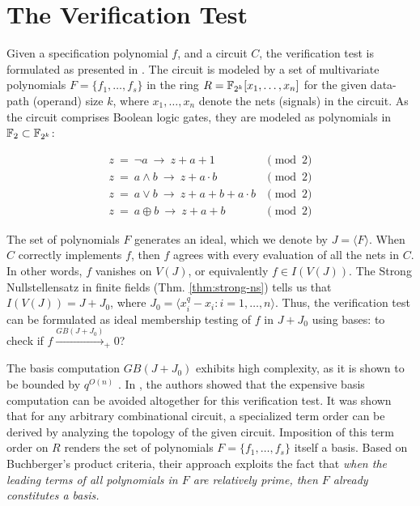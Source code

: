 \section{The Verification Test}
\label{sec:verify}

Given a specification polynomial $f$, and a circuit $C$, the
verification test is formulated as presented in
\cite{lv:tcad2013}. The circuit is modeled by a set of multivariate
polynomials $F=\{f_1,\dots,f_s\}$ in the ring $R={\mathbb{F}}_{2^k}[x_1,\dots,x_n]$
for the given data-path (operand) size $k$, where $x_1,\dots,x_n$
denote the nets (signals) in the circuit. As the circuit comprises
Boolean logic gates, they are modeled as polynomials in ${\mathbb{F}}_2 \subset
{\mathbb{F}}_{2^k}$:

\begin{equation}
\label{bool2poly}
\begin{split}
z ~ =  ~ \neg a ~ \rightarrow ~ z+a+1 & \pmod 2  \\
z ~ =  ~ a \wedge b ~ \rightarrow ~ z+a \cdot b & \pmod 2\\
z ~ =  ~ a \vee b ~ \rightarrow ~ z+a+b+a \cdot b & \pmod 2 \\
z ~ =  ~ a \oplus b ~ \rightarrow ~ z+a+b & \pmod 2 
\end{split}
\end{equation}

The set of polynomials $F$ generates an ideal, which we denote by $J =
\langle F\rangle$. When $C$ correctly implements $f$, then $f$ agrees
with every evaluation of all the nets in $C$. In other words, $f$
vanishes on $V(J)$, or equivalently $f \in I(V(J))$. The Strong
Nullstellensatz in finite fields (Thm. \ref{thm:strong-ns}) tells us
that $I(V(J)) = J + J_0$, where $J_0 = \langle x_i^q-x_i:
i=1,\dots,n\rangle$. Thus, the verification test can be formulated as
ideal membership testing of $f$ in $J+J_0$ using \Grobner bases: to
check if $f\xrightarrow{GB(J+J_0)}_+0$?

The \Grobner basis computation $GB(J+J_0)$ exhibits high
complexity, as it is shown to be bounded by
$q^{O(n)}$ \cite{gao:qe-gf-gb}. In \cite{wienand:cav08}
\cite{lv:tcad2013}, the authors showed that the expensive \Grobner
basis computation can be avoided altogether for this verification
test. It was shown that for any arbitrary combinational circuit, a
specialized term order can be derived by analyzing the topology of the
given circuit. Imposition of this term order on $R$ renders the set of
polynomials $F=\{f_1,\dots,f_s\}$ itself a \Grobner basis. Based on
Buchberger's product criteria, their approach exploits the fact
that {\it when the leading terms of all polynomials in $F$ are
  relatively prime, then $F$ already constitutes a \Grobner basis.}

